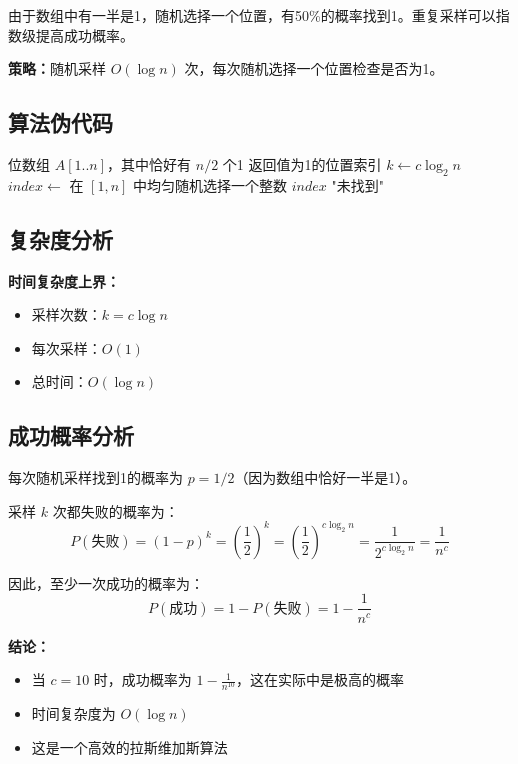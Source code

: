 \documentclass[UTF8,12pt,a4paper]{ctexart}
\begin{document}
由于数组中有一半是1，随机选择一个位置，有50\%的概率找到1。重复采样可以指数级提高成功概率。

\textbf{策略：}随机采样 $O(\log n)$ 次，每次随机选择一个位置检查是否为1。

\subsection*{算法伪代码}

\begin{algorithm}[H]
	\caption{随机搜索1（拉斯维加斯算法）}
	\begin{algorithmic}[1]
		\Require 位数组 $A[1..n]$，其中恰好有 $n/2$ 个1
		\Ensure 返回值为1的位置索引
		\State $k \gets c \log_2 n$ 
			\State $index \gets$ 在 $[1, n]$ 中均匀随机选择一个整数
				\State \Return $index$
			\EndIf
		\EndFor
		\State \Return "未找到" 
	\end{algorithmic}
\end{algorithm}

\subsection*{复杂度分析}

\textbf{时间复杂度上界：}
\begin{itemize}
	\item 采样次数：$k = c \log n$
	\item 每次采样：$O(1)$
	\item 总时间：$O(\log n)$
\end{itemize}

\subsection*{成功概率分析}

每次随机采样找到1的概率为 $p = 1/2$（因为数组中恰好一半是1）。

采样 $k$ 次都失败的概率为：
$$P(\text{失败}) = (1 - p)^k = \left(\frac{1}{2}\right)^k = \left(\frac{1}{2}\right)^{c \log_2 n} = \frac{1}{2^{c \log_2 n}} = \frac{1}{n^c}$$

因此，至少一次成功的概率为：
$$P(\text{成功}) = 1 - P(\text{失败}) = 1 - \frac{1}{n^c}$$

\textbf{结论：}
\begin{itemize}
	\item 当 $c = 10$ 时，成功概率为 $1 - \frac{1}{n^{10}}$，这在实际中是极高的概率
	\item 时间复杂度为 $O(\log n)$
	\item 这是一个高效的拉斯维加斯算法
\end{itemize}
\end{document}
